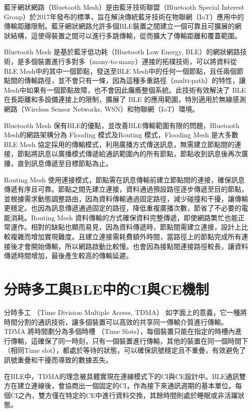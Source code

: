 \begin{ZhChapter}
藍牙網狀網路（Bluetooth Mesh）是由藍牙技術聯盟（Bluetooth Special Interest Group）於2017年發布的標準，旨在解決傳統藍牙技術在物聯網（IoT）應用中的傳輸距離限制。藍牙網狀網路允許多個BLE裝置之間建立一個可靠且可擴展的網狀結構，這使得裝置之間可以進行多跳傳輸，從而擴大了傳輸距離和覆蓋範圍。

Bluetooth Mesh 是基於藍牙低功耗（Bluetooth Low Energy, BLE）的網狀網路技術，是多個裝置進行多對多（many-to-many）連接的拓樸技術，可以將資料從BLE Mesh中的其中一個節點，發送至BLE Mesh中的任何一個節點，且任兩個節點間的傳輸路徑，並不會只有一條，因為這種多重路徑（multi-path）的特性，讓Mesh中如果有一個節點故障，也不會因此癱瘓整個系統。此技術有效解決了 BLE 在長距離和多設備連接上的限制，擴展了 BLE 的應用範圍，特別適用於無線感測網路（Wireless Sensor Networks, WSN）和物聯網（IoT）環境。

Bluetooth Mesh 保有BLE的優點，並改善BLE傳輸範圍有限的問題，Bluetooth Mesh的網路架構分為 Flooding 模式及Routing 模式，Flooding Mesh 是大多數 BLE Mesh 協定採用的傳輸模式，利用廣播方式傳送訊息，無需建立節點間的連接，節點將訊息以廣播模式傳遞給通訊範圍內的所有節點，節點收到訊息後再次廣播，直到訊息傳遞至目標節點為止。

Routing Mesh 使用連接模式，節點需在訊息傳輸前建立節點間的連接，確保訊息傳遞有序且可靠。節點之間先建立連接，資料通過預設路徑逐步傳遞至目的節點，並根據需求動態調整路由，因為資料傳輸通過固定路徑，減少碰撞和干擾，讓傳輸更穩定。也因為訊息傳遞通過固定的路徑，降低重複廣播次數，節省了不必要的電能消耗。Routing Mesh 資料傳輸的方式確保資料完整傳遞，即使網路繁忙也能正常運作。相對的缺點也顯而易見，因為資料傳遞時，節點間需建立連接，設計上比較複雜而增加實現難度。且建立連接需耗費額外時間，當路徑上的節點完成所有連接後才會開始傳輸，所以網路啟動比較慢。也會因為接點間連接路徑較長，讓資料傳遞時間增加，最後產生較高的傳輸延遲。

\section{分時多工與BLE中的CI與CE機制}

分時多工 （Time Division Multiple Access, TDMA） 如字面上的意義，它一種將時間分割的通訊技術，讓多個裝置可以高效的共享同一傳輸介質進行傳輸。TDMA 將時間劃分為多個時槽 （Time Slots），每個裝置只能在指定的時槽內進行傳輸，這確保了同一時刻，只有一個裝置進行傳輸，其他的裝置在同一個時間下（相同Time slot），都處於等待的狀態，可以確保訊號穩定且不重疊，有效避免了訊號重疊和干擾而導致的數據丟失。

在BLE中，TDMA的理念被具體實現在連線模式下的CI與CE設計中。BLE通訊雙方在建立連線後，會協商出一個固定的CI，作為接下來通訊週期的基本單位。每個CI之內，雙方僅在特定的CE中進行資料交換，其餘時間則處於睡眠或非活躍狀態。


\end{ZhChapter}
